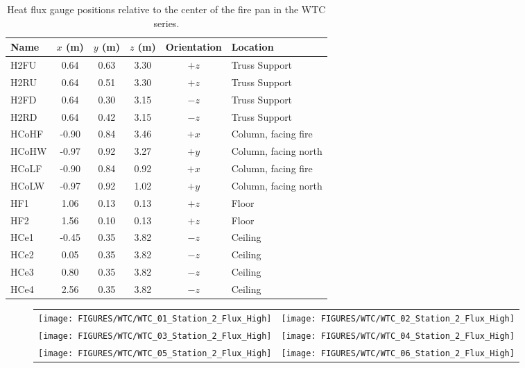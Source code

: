 \begin{table}[h!]
\caption{Heat flux gauge positions relative to the center of the fire pan in the WTC series.}
\begin{center}
\begin{tabular}{|l|c|c|c|c|l|}
\hline
Name    & $x$ (m)   & $y$ (m) & $z$ (m)   & Orientation  & Location  \\ \hline \hline
H2FU    & 0.64      & 0.63    & 3.30      &     $+z$     & Truss Support         \\ \hline
H2RU    & 0.64      & 0.51    & 3.30      &     $+z$     & Truss Support          \\ \hline
H2FD    & 0.64      & 0.30    & 3.15      &     $-z$     & Truss Support          \\ \hline
H2RD    & 0.64      & 0.42    & 3.15      &     $-z$     & Truss Support          \\ \hline
HCoHF   & -0.90     & 0.84    & 3.46      &     $+x$     & Column, facing fire          \\ \hline
HCoHW   & -0.97     & 0.92    & 3.27      &     $+y$     & Column, facing north          \\ \hline
HCoLF   & -0.90     & 0.84    & 0.92      &     $+x$     & Column, facing fire          \\ \hline
HCoLW   & -0.97     & 0.92    & 1.02      &     $+y$     & Column, facing north          \\ \hline
HF1     & 1.06      & 0.13    & 0.13      &     $+z$     & Floor          \\ \hline
HF2     & 1.56      & 0.10    & 0.13      &     $+z$     & Floor          \\ \hline
HCe1    & -0.45     & 0.35    & 3.82      &     $-z$     & Ceiling          \\ \hline
HCe2    &  0.05     & 0.35    & 3.82      &     $-z$     & Ceiling          \\ \hline
HCe3    &  0.80     & 0.35    & 3.82      &     $-z$     & Ceiling          \\ \hline
HCe4    &  2.56     & 0.35    & 3.82      &     $-z$     & Ceiling          \\ \hline
\end{tabular}
\end{center}
\label{WTC_Gauges}
\end{table}

\newpage

\begin{figure}[p]
\begin{tabular*}{\textwidth}{l@{\extracolsep{\fill}}r}
\texttt{[image: FIGURES/WTC/WTC\_01\_Station\_2\_Flux\_High]} &
\texttt{[image: FIGURES/WTC/WTC\_02\_Station\_2\_Flux\_High]} \\
\texttt{[image: FIGURES/WTC/WTC\_03\_Station\_2\_Flux\_High]} &
\texttt{[image: FIGURES/WTC/WTC\_04\_Station\_2\_Flux\_High]} \\
\texttt{[image: FIGURES/WTC/WTC\_05\_Station\_2\_Flux\_High]} &
\texttt{[image: FIGURES/WTC/WTC\_06\_Station\_2\_Flux\_High]}
\end{tabular*}
\label{NIST_WTC_Station_2_Flux_High}
\end{figure}

